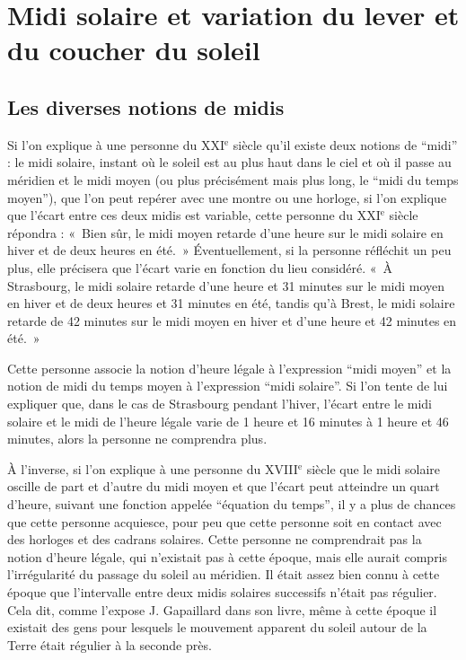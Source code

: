 \documentclass[a4paper]{article}
\newenvironment{texte}{\rmfamily}{}
\newcommand{\ee}[0]{$^\mathrm{e}$}
\begin{document}
\begin{texte}
\section{Midi solaire et variation du lever et du coucher du soleil}

\subsection{Les diverses notions de midis}

Si l'on explique à une personne du XXI\ee{} siècle qu'il existe
deux notions de ``midi'' : le midi solaire, instant où le soleil
est au plus haut dans le ciel et où il passe au méridien et 
le midi moyen (ou plus précisément mais plus long, le
``midi du temps moyen''), que l'on peut repérer avec une montre ou une horloge,
si l'on explique que l'écart entre ces deux midis est variable,
cette personne du XXI\ee{} siècle répondra : «~Bien sûr, 
le midi moyen retarde d'une heure sur le midi solaire en hiver
et de deux heures en été.~» Éventuellement, si la personne réfléchit
un peu plus, elle précisera que l'écart varie en fonction du lieu
considéré. «~À Strasbourg, le midi solaire retarde d'une heure
et 31 minutes sur le midi moyen en hiver et de deux heures et
31 minutes en été, tandis qu'à Brest, le midi solaire retarde
de 42 minutes sur le midi moyen en hiver et d'une heure et 42 minutes
en été.~»

Cette personne associe la notion d'heure légale à l'expression ``midi moyen''
et la notion de midi du temps moyen à l'expression ``midi solaire''.
Si l'on tente de lui expliquer que, dans le cas de Strasbourg pendant l'hiver, l'écart
entre le midi solaire et le midi de l'heure légale varie
de 1 heure et 16 minutes à 1 heure et 46 minutes, alors la personne
ne comprendra plus.

À l'inverse, si l'on explique à une personne du XVIII\ee{} siècle que
le midi solaire oscille de part et d'autre du midi moyen et que
l'écart peut atteindre un quart d'heure, suivant une fonction appelée
``équation du temps'', il y a plus de chances que cette personne
acquiesce, pour peu que cette personne soit en contact avec des
horloges et des cadrans solaires. Cette personne ne comprendrait pas
la notion d'heure légale, qui n'existait pas à cette époque, mais elle
aurait compris l'irrégularité du passage du soleil au méridien. Il
était assez bien connu à cette époque que l'intervalle entre deux
midis solaires successifs n'était pas régulier. Cela dit, comme
l'expose J. Gapaillard dans son livre, même à cette époque il existait
des gens pour lesquels le mouvement apparent du soleil autour de la
Terre était régulier à la seconde près.


\end{texte}
\end{document}
